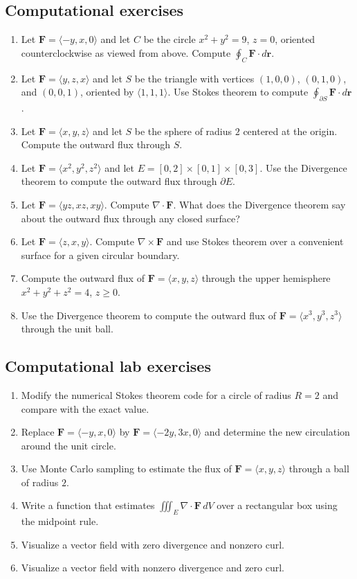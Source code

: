 \documentclass[11pt]{article}
\newcommand{\vr}{\mathbf r}
\newcommand{\vF}{\mathbf F}
\begin{document}
\subsection*{Computational exercises}
\begin{enumerate}
  \item Let $\vF=\langle-y,x,0\rangle$ and let $C$ be the circle $x^2+y^2=9$, $z=0$, oriented counterclockwise as viewed from above. Compute $\oint_C\vF\cdot d\vr$.
  \item Let $\vF=\langle y,z,x\rangle$ and let $S$ be the triangle with vertices $(1,0,0)$, $(0,1,0)$, and $(0,0,1)$, oriented by $\langle1,1,1\rangle$. Use Stokes theorem to compute $\oint_{\partial S}\vF\cdot d\vr$.
  \item Let $\vF=\langle x,y,z\rangle$ and let $S$ be the sphere of radius $2$ centered at the origin. Compute the outward flux through $S$.
  \item Let $\vF=\langle x^2,y^2,z^2\rangle$ and let $E=[0,2]\times[0,1]\times[0,3]$. Use the Divergence theorem to compute the outward flux through $\partial E$.
  \item Let $\vF=\langle yz,xz,xy\rangle$. Compute $\nabla\cdot\vF$. What does the Divergence theorem say about the outward flux through any closed surface?
  \item Let $\vF=\langle z,x,y\rangle$. Compute $\nabla\times\vF$ and use Stokes theorem over a convenient surface for a given circular boundary.
  \item Compute the outward flux of $\vF=\langle x,y,z\rangle$ through the upper hemisphere $x^2+y^2+z^2=4$, $z\ge0$.
  \item Use the Divergence theorem to compute the outward flux of $\vF=\langle x^3,y^3,z^3\rangle$ through the unit ball.
\end{enumerate}

\subsection*{Computational lab exercises}
\begin{enumerate}
  \item Modify the numerical Stokes theorem code for a circle of radius $R=2$ and compare with the exact value.
  \item Replace $\vF=\langle-y,x,0\rangle$ by $\vF=\langle-2y,3x,0\rangle$ and determine the new circulation around the unit circle.
  \item Use Monte Carlo sampling to estimate the flux of $\vF=\langle x,y,z\rangle$ through a ball of radius $2$.
  \item Write a function that estimates $\iiint_E\nabla\cdot\vF\,dV$ over a rectangular box using the midpoint rule.
  \item Visualize a vector field with zero divergence and nonzero curl.
  \item Visualize a vector field with nonzero divergence and zero curl.
\end{enumerate}
\end{document}
